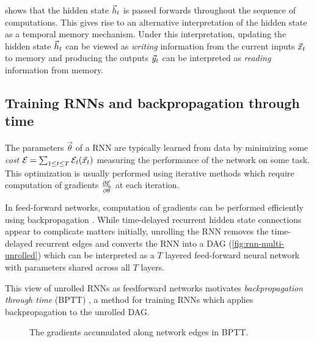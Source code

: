  shows that the hidden state $\vec{h}_t$ is passed
forwards throughout the sequence of computations. This gives rise to an
alternative interpretation of the hidden state as a temporal memory mechanism.
Under this interpretation, updating the hidden state $\vec{h}_t$ can be viewed as
\emph{writing} information from the current inputs $\vec{x}_t$ to memory and
producing the outputs $\vec{y}_t$ can be interpreted as \emph{reading} information
from memory.


\subsection{Training RNNs and backpropagation through time}


The parameters $\vec{\theta}$ of a RNN are typically learned from data by
minimizing some \emph{cost} $\mathcal{E} = \sum_{1 \leq t \leq T}
\mathcal{E}_t(\vec{x}_t)$ measuring the performance of the network on some task.
This optimization is usually performed using iterative methods which require
computation of gradients $\frac{\partial \mathcal{E}}{\partial \vec{\theta}}$ at each
iteration.

In feed-forward networks, computation of gradients can be performed efficiently
using backpropagation
\citep{bryson1963optimal,linnainmaa1970representation,rumelhart1988learning}.
While time-delayed recurrent hidden state connections appear to complicate
matters initially, unrolling the RNN removes the time-delayed recurrent edges
and converts the RNN into a DAG (\eg \vref{fig:rnn-multi-unrolled}) which can
be interpreted as a $T$ layered feed-forward neural network with parameters
shared across all $T$ layers.

This view of unrolled RNNs as feedforward networks motivates
\emph{backpropagation through time} (BPTT) \citep{goller1996learning}, a method
for training RNNs which applies backpropagation to the unrolled DAG.

\begin{figure}[tb]
    \centering
    
    \caption{The gradients accumulated along network edges in BPTT.}
    \label{fig:rnn-bptt}
\end{figure}

